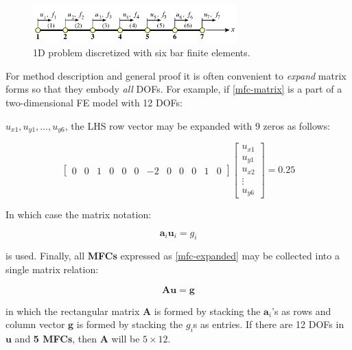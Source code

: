 \documentclass[10pt,b5paper,titlepage]{book}
\newcommand{\m}{\mathbf}
\begin{document}
\begin{figure}[ht]
    \centering
    \includegraphics[width=0.70\textwidth]{img/1D_mfc_bar.png}
    \caption{1D problem discretized with six bar finite elements.}
    \label{fig:1D-MFC-bar-png}
\end{figure}

For method description and general proof it is often convenient to \textit{expand}
matrix forms so that they embody \textit{all} DOFs. For example, if
\eqref{mfc-matrix} is a part of a two-dimensional FE model with 12 DOFs:

$ u_{x1}, u_{y1}, \dots, u_{y6} $, the LHS row vector may be expanded with
9 zeros as follows:

\begin{equation}
    \begin{bmatrix}
        0 & 0 & 1 & 0 & 0 & 0 & -2 & 0 & 0 & 0 & 1 & 0
    \end{bmatrix}
    \begin{bmatrix}
        u_{x1} \\
        u_{y1} \\
        u_{x2} \\
        \vdots \\
        u_{y6}
    \end{bmatrix}
    = 0.25
\end{equation}

In which case the matrix notation:

\begin{equation}\label{mfc-expanded}
    \m{a}_i \m{u}_i = g_i
\end{equation}

is used. Finally, all \textbf{MFCs} expressed as \eqref{mfc-expanded} may be collected
into a single matrix relation:

\begin{equation}\label{mfc-expanded-matrix}
    \m{A} \m{u} = \m{g}
\end{equation}

in which the rectangular matrix $ \m{A} $ is formed by stacking the
$ \m{a}_i $'s as rows and column vector $ \m{g} $ is formed by stacking
the $ g_i $s as entries. If there are 12 DOFs in $ \m{u} $ and \textbf{5 MFCs},
then $ \m{A} $ will be $ 5 \times 12 $.
\end{document}
